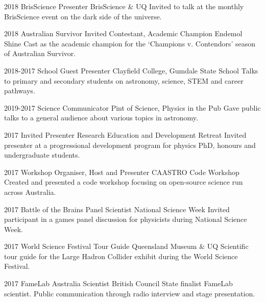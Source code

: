 \begin{entrylist}
\entry
    {2018}
    {BrisScience Presenter}
    {BrisScience \& UQ}
    {Invited to talk at the monthly BrisScience event on the dark side of the universe.}
\end{entrylist}
\begin{entrylist}
\entry
    {2018}
    {Australian Survivor Invited Contestant, Academic Champion}
    {Endemol Shine}
    {Cast as the academic champion for the `Champions v. Contendors' season of Australian Survivor.}
\end{entrylist}
\begin{entrylist}
\entry
    {2018-2017}
    {School Guest Presenter}
    {Clayfield College, Gumdale State School}
    {Talks to primary and secondary students on astronomy, science, STEM and career pathways.}
\end{entrylist}
\begin{entrylist}
\entry
   {2019-2017}
   {Science Communicator}
   {Pint of Science, Physics in the Pub}
   {Gave public talks to a general audience about various topics in astronomy.}
\end{entrylist}
\begin{entrylist}
\entry
    {2017}
    {Invited Presenter}
    {Research Education and Development Retreat}
    {Invited presenter at a progressional development program for physics PhD, honours and undergraduate students.}
\end{entrylist}
\begin{entrylist}
\entry
    {2017}
    {Workshop Organiser, Host and Presenter}
    {CAASTRO Code Workshop}
    {Created and presented a code workshop focusing on open-source science run across Australia.}
\end{entrylist}
\begin{entrylist}
\entry
    {2017}
    {Battle of the Brains Panel Scientist}
    {National Science Week}
    {Invited participant in a games panel discussion for physicists during National Science Week.}
\end{entrylist}
\begin{entrylist}
\entry
    {2017}
    {World Science Festival Tour Guide}
    {Queensland Museum \& UQ}
    {Scientific tour guide for the Large Hadron Collider exhibit during the World Science Festival.}
\end{entrylist}
\begin{entrylist}
\entry
    {2017}
    {FameLab Australia Scientist}
    {British Council}
    {State finalist FameLab scientist. Public communication through radio interview and stage presentation.}
\end{entrylist}
